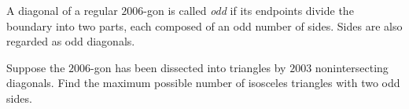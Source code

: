 A diagonal of a regular $2006$-gon is called \emph{odd} if its endpoints divide the boundary into two parts, each composed of an odd number of sides. Sides are also regarded as odd diagonals.

Suppose the $2006$-gon has been dissected into triangles by $2003$ nonintersecting diagonals. Find the maximum possible number of isosceles triangles with two odd sides.
